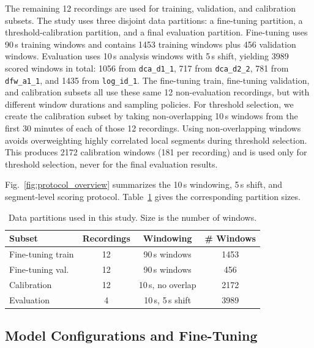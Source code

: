 \documentclass[conference]{IEEEtran}
\begin{document}
The remaining 12 recordings are used for training, validation, and calibration subsets. The study uses three disjoint data partitions: a fine-tuning partition, a threshold-calibration partition, and a final evaluation partition. Fine-tuning uses 90\,s training windows and contains 1453 training windows plus 456 validation windows. Evaluation uses 10\,s analysis windows with 5\,s shift, yielding 3989 scored windows in total: 1056 from \texttt{dca\_d1\_1}, 717 from \texttt{dca\_d2\_2}, 781 from \texttt{dfw\_a1\_1}, and 1435 from \texttt{log\_id\_1}. The fine-tuning train, fine-tuning validation, and calibration subsets all use these same 12 non-evaluation recordings, but with different window durations and sampling policies. For threshold selection, we create the calibration subset by taking non-overlapping 10\,s windows from the first 30 minutes of each of those 12 recordings. Using non-overlapping windows avoids overweighting highly correlated local segments during threshold selection. This produces 2172 calibration windows (181 per recording) and is used only for threshold selection, never for the final evaluation results.

Fig.~\ref{fig:protocol_overview} summarizes the 10\,s windowing, 5\,s shift, and segment-level scoring protocol. Table~\ref{tab:data_partitions} gives the corresponding partition sizes.

\begin{table}[t]
\centering
\caption{Data partitions used in this study. Size is the number of windows.}
\label{tab:data_partitions}
\renewcommand{\arraystretch}{1.05}
\footnotesize
\begin{tabular}{@{}lccc@{}}
\toprule
\textbf{Subset} & \textbf{Recordings} & \textbf{Windowing} & \textbf{\# Windows} \\
\midrule
Fine-tuning train & 12 & 90\,s windows & 1453 \\
Fine-tuning val. & 12 & 90\,s windows & 456 \\
Calibration & 12 & 10\,s, no overlap & 2172 \\
Evaluation & 4 & 10\,s, 5\,s shift & 3989 \\
\bottomrule
\end{tabular}
\vspace{-2mm}
\end{table}

\subsection{Model Configurations and Fine-Tuning}
\end{document}
